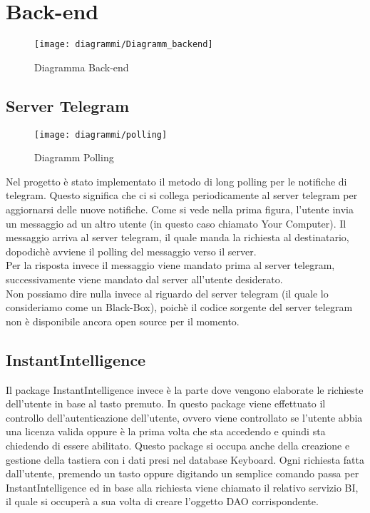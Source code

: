 \section{Back-end}
\label{sec:backend}

\begin{figure}
    \centering 
    \texttt{[image: diagrammi/Diagramm\_backend]} 
    \caption{Diagramma Back-end }
\end{figure}  

\subsection{Server Telegram}

\begin{figure}
    \centering 
    \texttt{[image: diagrammi/polling]} 
    \caption{Diagramm Polling }
\end{figure}  

Nel progetto è stato implementato il metodo di long polling per le notifiche di telegram. Questo significa che ci si collega periodicamente al server telegram per aggiornarsi delle nuove notifiche. Come si vede nella prima figura, l’utente invia un messaggio ad un altro utente (in questo caso chiamato Your Computer). Il messaggio arriva al server telegram, il quale manda la richiesta al destinatario, dopodichè avviene il polling del messaggio verso il server. \\
Per la risposta invece il messaggio viene mandato prima al server telegram, successivamente viene mandato dal server all’utente desiderato.
\\Non possiamo dire nulla invece al riguardo del server telegram (il quale lo consideriamo come un Black-Box), poichè il codice sorgente del server telegram  non è disponibile ancora open source per il momento.


%


\subsection{InstantIntelligence}

Il package InstantIntelligence invece è la parte dove vengono elaborate le richieste dell’utente in base al tasto premuto. In questo package viene effettuato il controllo dell’autenticazione dell’utente, ovvero viene controllato se l’utente abbia una licenza valida oppure è la prima volta che sta accedendo e quindi sta chiedendo di essere abilitato.  Questo package si occupa anche della creazione e gestione della tastiera con i dati presi nel database Keyboard. Ogni richiesta fatta dall’utente, premendo un tasto oppure digitando un semplice comando passa per InstantIntelligence ed in base alla richiesta viene chiamato il relativo servizio BI, il quale si occuperà a sua volta di creare l’oggetto DAO corrispondente. \\\\


